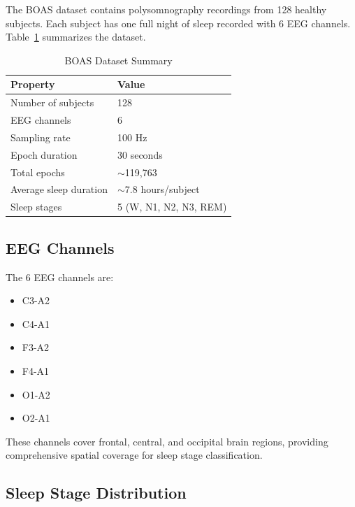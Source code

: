 The BOAS dataset contains polysomnography recordings from 128 healthy subjects. Each subject has one full night of sleep recorded with 6 EEG channels. Table~\ref{tab:boas_summary} summarizes the dataset.

\begin{table}[htbp]
    \centering
    \caption{BOAS Dataset Summary}
    \label{tab:boas_summary}
    \begin{tabular}{ll}
        \toprule
        \textbf{Property} & \textbf{Value} \\
        \midrule
        Number of subjects & 128 \\
        EEG channels & 6 \\
        Sampling rate & 100 Hz \\
        Epoch duration & 30 seconds \\
        Total epochs & $\sim$119,763 \\
        Average sleep duration & $\sim$7.8 hours/subject \\
        Sleep stages & 5 (W, N1, N2, N3, REM) \\
        \bottomrule
    \end{tabular}
\end{table}

\subsection{EEG Channels}
\label{subsec:eeg_channels}

The 6 EEG channels are:
\begin{itemize}
    \item C3-A2
    \item C4-A1
    \item F3-A2
    \item F4-A1
    \item O1-A2
    \item O2-A1
\end{itemize}

These channels cover frontal, central, and occipital brain regions, providing comprehensive spatial coverage for sleep stage classification.

\subsection{Sleep Stage Distribution}
\label{subsec:stage_distribution}


